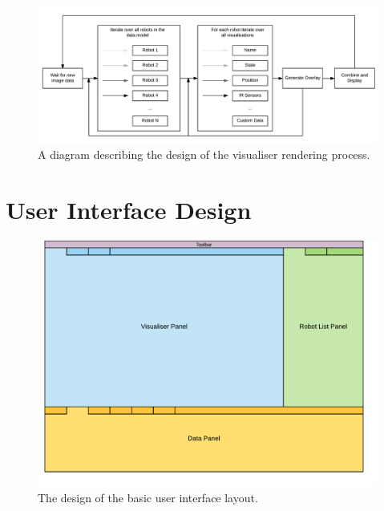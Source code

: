 \begin{figure}[h]
	\centering
	\includegraphics[scale=0.7]{Figures/VisualiserProcess.png}
	\decoRule
	\caption[Visualiser Render Process Design]{A diagram describing the design of the visualiser rendering process.}
	\label{fig:VisualiserProcess}
\end{figure}


\section{User Interface Design}
\begin{figure}[h]
	\centering
	\includegraphics[scale=1]{Figures/UILayout.png}
	\decoRule
	\caption[UI Layout]{The design of the basic user interface layout.}
	\label{fig:UILayout}
\end{figure}


